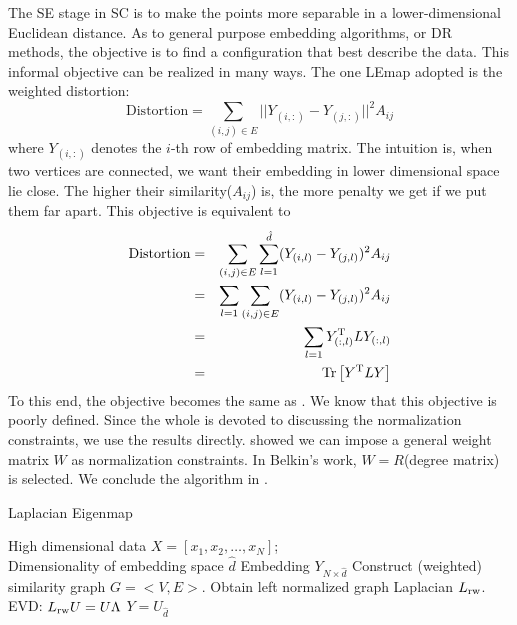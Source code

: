 The SE stage in SC is to make
the points more separable in a lower-dimensional 
Euclidean distance. As to general purpose embedding algorithms, 
or DR methods, the objective is to find a configuration that 
best describe the data. This informal objective can be 
realized in many ways. The one LEmap adopted is the weighted 
distortion:
\begin{equation}
	\text{Distortion} = \sum_{(i,j) \in E} ||Y_{(i,:)} - Y_{(j,:)}||^2 A_{ij}
\end{equation}
where $ Y_{(i,:)} $ denotes the $ i $-th row of embedding matrix. 
The intuition is, when two vertices are connected, we want 
their embedding in lower dimensional space lie close. 
The higher their similarity($ A_{ij} $) is, the more penalty 
we get if we put them far apart. This objective is equivalent to 
\begin{eqnarray}
	\text{Distortion} &=& \sum_{(i,j) \in E} 
	\sum_{l=1}^{\hat{d}}(Y_{(i,l)} - Y_{(j,l)})^2 A_{ij} \\
	&=& \sum_{l=1} \sum_{(i,j) \in E} (Y_{(i,l)} - Y_{(j,l)})^2 A_{ij} \\
	&=& \sum_{l=1} Y_{(:,l)}^\mathrm{T} L Y_{(:,l)} \\
	&=& \mathrm{Tr}\left[ Y^\mathrm{T} L Y \right]
\end{eqnarray}
To this end, the objective becomes the same as \req{\ref{eq:cut_relax}}. 
We know that this objective is poorly defined. Since the whole 
\rsec{\ref{sec:combinatoric}} is devoted to discussing the normalization 
constraints, we use the results directly. 
\rsec{\ref{sec:combinatoric}} showed we can 
impose a general weight matrix $ W $ as normalization 
constraints. In Belkin's work\cite{belkin2003laplacian}, 
$ W=R $(degree matrix) is selected. We conclude the algorithm 
in \ralg{\ref{alg:lemap}}. 

\begin{algorithm}[htb]
	\caption{Laplacian Eigenmap}
	\label{alg:lemap}
	\begin{algorithmic}[1]
		\REQUIRE High dimensional data $X = [x_1, x_2, \ldots, x_N]$; \\
			Dimensionality of embedding space $ \hat{d} $
		\ENSURE Embedding $ Y_{N \times \hat{d}} $
		\STATE Construct (weighted) similarity graph $ G = <V, E> $. 
		\COMMENT{\rsec{\ref{sec:metric_hdd}} }
		\STATE Obtain left normalized graph Laplacian $ L_{\text{rw}} $. 
		\STATE EVD: $ L_{\text{rw}}U = U \Lambda $
		\STATE $ Y = U_{\hat{d}} $
	\end{algorithmic}
\end{algorithm}

